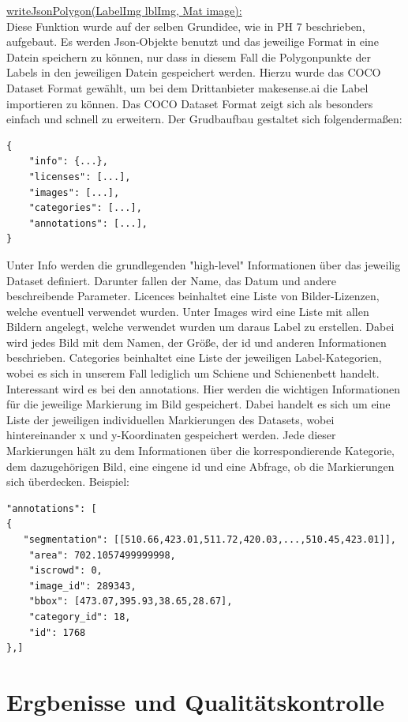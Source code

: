 \documentclass[11pt]{scrartcl}
\begin{document}
\noindent
\underline{writeJsonPolygon(LabelImg lblImg, Mat image):}
\\

\noindent
Diese Funktion wurde auf der selben Grundidee, wie in PH 7 beschrieben, aufgebaut. Es werden Json-Objekte benutzt und das jeweilige Format in eine Datein speichern zu können, nur dass in diesem Fall die Polygonpunkte der Labels in den jeweiligen Datein gespeichert werden. Hierzu wurde das COCO Dataset Format gewählt, um bei dem Drittanbieter makesense.ai die Label importieren zu können. Das COCO Dataset Format zeigt sich als besonders einfach und schnell zu erweitern. Der Grudbaufbau gestaltet sich folgendermaßen:
\begin{lstlisting}  
{
    "info": {...},
    "licenses": [...],
    "images": [...],
    "categories": [...], 
    "annotations": [...],
}
\end{lstlisting}
Unter Info werden die grundlegenden "high-level" Informationen über das jeweilig Dataset definiert. Darunter fallen der Name, das Datum und andere beschreibende Parameter. Licences beinhaltet eine Liste von Bilder-Lizenzen, welche eventuell verwendet wurden. Unter Images wird eine Liste mit allen Bildern angelegt, welche verwendet wurden um daraus Label zu erstellen. Dabei wird jedes Bild mit dem Namen, der Größe, der id und anderen Informationen beschrieben. Categories beinhaltet eine Liste der jeweiligen Label-Kategorien, wobei es sich in unserem Fall lediglich um Schiene und Schienenbett handelt. Interessant wird es bei den annotations. Hier werden die wichtigen Informationen für die jeweilige Markierung im Bild gespeichert. Dabei handelt es sich um eine Liste der jeweiligen individuellen Markierungen des Datasets, wobei hintereinander x und y-Koordinaten gespeichert werden. Jede dieser Markierungen hält zu dem Informationen über die korrespondierende Kategorie, dem dazugehörigen Bild, eine eingene id und eine Abfrage, ob die Markierungen sich überdecken. Beispiel:
\begin{lstlisting}  
"annotations": [
{
   "segmentation": [[510.66,423.01,511.72,420.03,...,510.45,423.01]],
    "area": 702.1057499999998,
    "iscrowd": 0,
    "image_id": 289343,
    "bbox": [473.07,395.93,38.65,28.67],
    "category_id": 18,
    "id": 1768
},]
\end{lstlisting}

\noindent

\noindent
\section{Ergbenisse und Qualitätskontrolle}
\label{sec:Ergebnisse und Qualitätskontrolle}
\end{document}
